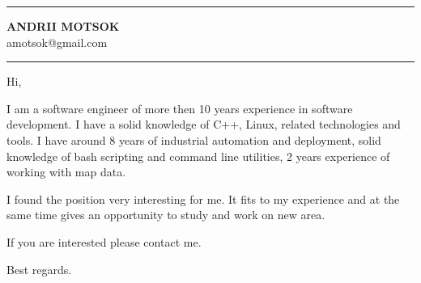 \documentclass{article}
\begin{document}
\noindent\hrule height 5pt \vspace{4mm} \noindent
{\selectfont\LARGE{\textbf{ANDRII MOTSOK}}} \\
{\color{cyan}amotsok@gmail.com}\\
{\color{lightgray}\hrule height 0.2mm}
\vspace{2mm}
\noindent
{\large
\par
Hi,\\\par
I am a software engineer of more then 10 years experience in software development. I have a solid knowledge of C++, 
Linux, related technologies and tools. I have around 8 years of industrial automation and deployment, solid 
knowledge of bash scripting and command line utilities, 2 years experience of working with map data.\par
I found the position very interesting for me. It fits to my experience and at the same time gives an opportunity to study 
and work on new area.
\\
\par If you are interested please contact me.
\par Best regards.
}
\end{document}
